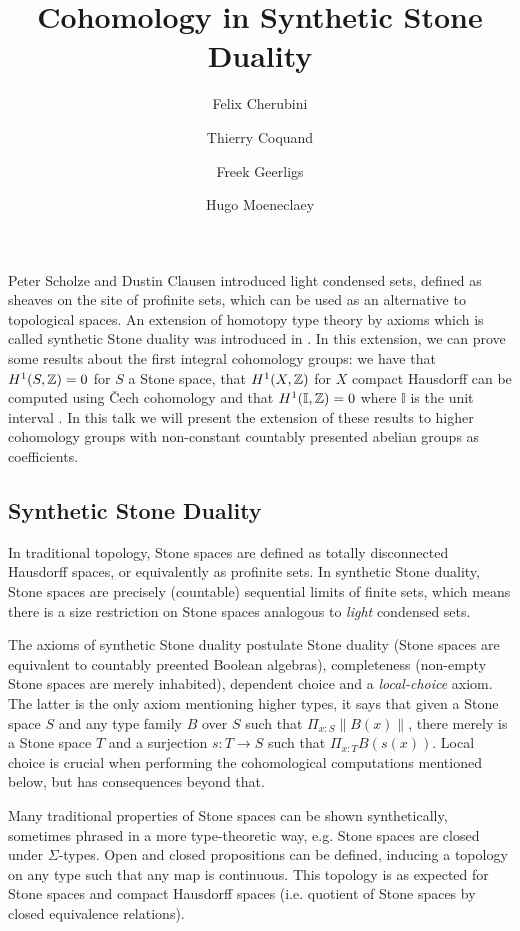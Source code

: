 \documentclass{../util/zariski}
\author{
Felix Cherubini %
\and 
 Thierry Coquand%
\and 
 Freek Geerligs%
\and
 Hugo Moeneclaey %
}
\title{Cohomology in Synthetic Stone Duality}
\begin{document}
\maketitle
Peter Scholze and Dustin Clausen \cite{Scholze} introduced light condensed sets, defined as sheaves on the site of profinite sets, which can be used as an alternative to topological spaces. 
An extension of homotopy type theory by axioms which is called synthetic Stone duality was introduced in \cite{synthetic-stone-duality}. In this extension, we can prove some results about the first integral cohomology groups: we have that $H^1(S,\mathbb{Z}) = 0$ for $S$ a Stone space, that $H^1(X,\mathbb{Z})$ for $X$ compact Hausdorff can be computed using \v{C}ech cohomology and that $H^1(\mathbb{I},\mathbb{Z}) = 0$ where $\mathbb{I}$ is the unit interval \cite{synthetic-stone-duality}. In this talk we will present the extension of these results to higher cohomology groups with non-constant countably presented abelian groups as coefficients.

\subsection*{Synthetic Stone Duality}

In traditional topology, Stone spaces are defined as totally disconnected Hausdorff spaces, or equivalently as profinite sets. In synthetic Stone duality, Stone spaces are precisely (countable) sequential limits of finite sets, which means there is a size restriction on Stone spaces analogous to \emph{light} condensed sets. 

The axioms of synthetic Stone duality postulate Stone duality (Stone spaces are equivalent to countably preented Boolean algebras), completeness (non-empty Stone spaces are merely inhabited), dependent choice and a \emph{local-choice} axiom. The latter is the only axiom mentioning higher types, it says that given a Stone space $S$ and any type family $B$ over $S$ such that $\Pi_{x:S} \| B(x)  \|$, there merely is a Stone space $T$ and a surjection $s:T\to S$ such that $\Pi_{x:T} B(s(x))$. Local choice is crucial when performing the cohomological computations mentioned below, but has consequences beyond that.

Many traditional properties of Stone spaces can be shown synthetically, sometimes phrased in a more type-theoretic way, e.g. Stone spaces are closed under $\Sigma$-types. Open and closed propositions can be defined, inducing a topology on any type such that any map is continuous. This topology is as expected for Stone spaces and compact Hausdorff spaces (i.e. quotient of Stone spaces by closed equivalence relations).
\end{document}
